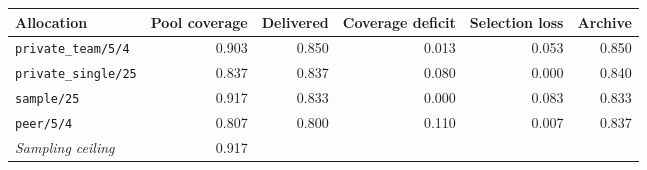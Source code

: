 \begin{tabular}{lrrrrr}
\toprule
Allocation & Pool coverage & Delivered & Coverage deficit & Selection loss & Archive \\
\midrule
\texttt{private\_team/5/4} & 0.903 & 0.850 & 0.013 & 0.053 & 0.850 \\
\texttt{private\_single/25} & 0.837 & 0.837 & 0.080 & 0.000 & 0.840 \\
\texttt{sample/25} & 0.917 & 0.833 & 0.000 & 0.083 & 0.833 \\
\texttt{peer/5/4} & 0.807 & 0.800 & 0.110 & 0.007 & 0.837 \\
\midrule
\emph{Sampling ceiling} & 0.917 & & & & \\
\bottomrule
\end{tabular}
